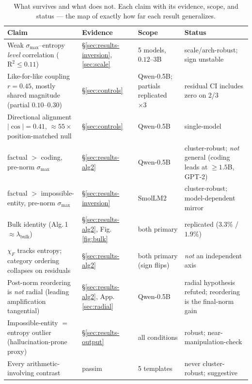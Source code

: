 \documentclass{article}
\begin{document}
\begin{table}[t]\centering\footnotesize
\renewcommand{\arraystretch}{1.25}
\begin{tabular}{@{}p{4.6cm}p{1.15cm}p{2.7cm}p{4.7cm}@{}}
\toprule
\textbf{Claim} & \textbf{Evidence} & \textbf{Scope} & \textbf{Status} \\
\midrule
Weak $\sigma_{\max}$--entropy \emph{level} correlation ($\mathrm{R}^2\le0.11$) & \S\ref{sec:results-inversion},\,\ref{sec:scale} & 5 models, $0.12$--$3$B & scale/arch-robust; sign unstable \\
Like-for-like coupling $r=0.45$, mostly shared magnitude (partial $0.10$--$0.30$) & \S\ref{sec:controls} & Qwen-0.5B; partials replicated $\times3$ & residual CI includes zero on 2/3 \\
Directional alignment $|\!\cos|=0.41$, $\approx\!55\times$ position-matched null & \S\ref{sec:controls} & Qwen-0.5B & single-model \\
factual $>$ coding, pre-norm $\sigma_{\max}$ & \S\ref{sec:results-alg2} & Qwen-0.5B & cluster-robust; \emph{not} general (coding leads at $\ge1.5$B, GPT-2) \\
factual $>$ impossible-entity, pre-norm $\sigma_{\max}$ & \S\ref{sec:results-inversion} & SmolLM2 & cluster-robust; model-dependent mirror \\
Bulk identity (Alg.\,1 $\approx\lambda_{\mathrm{bulk}}$) & \S\ref{sec:results-alg2}, Fig.\,\ref{fig:bulk} & both primary & replicated ($3.3\%$ / $1.9\%$) \\
$\chi_F$ tracks entropy; category ordering collapses on residuals & \S\ref{sec:results-alg2} & both primary (sign flips) & \emph{not} an independent axis \\
Post-norm reordering is \emph{not} radial (leading amplification tangential) & \S\ref{sec:results-alg2}, App.\,\ref{sec:radial} & Qwen-0.5B & radial hypothesis refuted; reordering is the final-norm gain \\
Impossible-entity $=$ entropy outlier (hallucination-prone proxy) & \S\ref{sec:results-output} & all conditions & robust; near-manipulation-check \\
Every arithmetic-involving contrast & passim & 5 templates & never cluster-robust; suggestive \\
\bottomrule
\end{tabular}
\caption{What survives and what does not. Each claim with its evidence, scope, and status --- the map
of exactly how far each result generalizes.}
\label{tab:survives}
\end{table}
\end{document}
